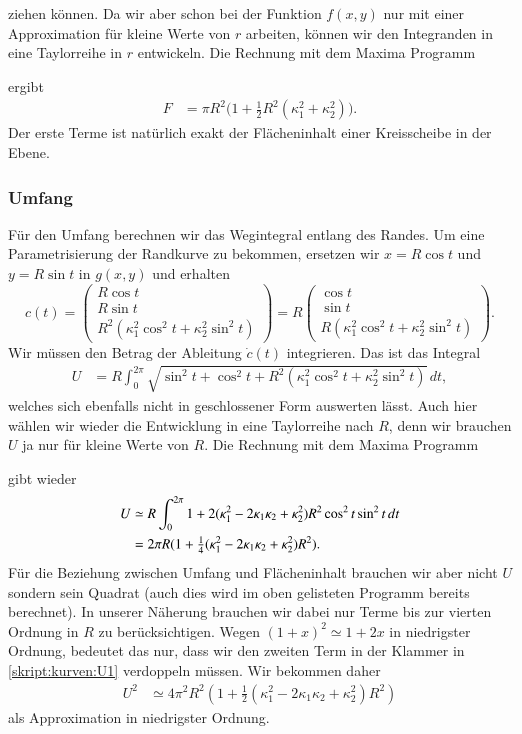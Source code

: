 ziehen können.
Da wir aber schon bei der Funktion $f(x,y)$ nur mit einer Approximation
für kleine Werte von $r$ arbeiten, können wir den Integranden in eine
Taylorreihe in $r$ entwickeln.
Die Rechnung mit dem Maxima Programm

ergibt
\begin{align*}
F
&=
\pi R^2
\bigl(
1
+
{\textstyle\frac12} R^2(\kappa_1^2+\kappa_2^2)
\bigr).
\end{align*}
Der erste Terme ist natürlich exakt der Flächeninhalt einer Kreisscheibe
in der Ebene.

\subsubsection{Umfang}
Für den Umfang berechnen wir das Wegintegral entlang des Randes.
Um eine Parametrisierung der Randkurve zu bekommen,
ersetzen wir $x=R\cos t$ und $y=R\sin t$ in $g(x,y)$ und erhalten
\[
c(t)
=
\begin{pmatrix}
R\cos t\\ R\sin t\\ R^2(\kappa_1^2\cos^2 t + \kappa_2^2\sin^2 t)
\end{pmatrix}
=
R
\begin{pmatrix}
\cos t\\ \sin t\\ R(\kappa_1^2\cos^2 t + \kappa_2^2\sin^2 t)
\end{pmatrix}.
\]
Wir müssen den Betrag der Ableitung $\dot c(t)$ integrieren.
Das ist das Integral
\begin{align*}
U
&=
R
\int_0^{2\pi}
\sqrt{
\sin^2 t + \cos^2 t 
+ R^2(\kappa_1^2 \cos^2 t + \kappa_2^2\sin^2 t)
}
\,dt,
\end{align*}
welches sich ebenfalls nicht in geschlossener Form auswerten lässt.
Auch hier wählen wir wieder die Entwicklung in eine Taylorreihe nach $R$,
denn wir brauchen $U$ ja nur für kleine Werte von $R$.
Die Rechnung mit dem Maxima Programm

gibt wieder
\begin{align}
U
&\simeq
R
\int_0^{2\pi}
1 + 2(\kappa_1^2 - 2\kappa_1\kappa_2 + \kappa_2^2)R^2 \cos^2 t\sin^2 t
\,dt
\notag
\\
&=
2\pi R
(
1
+ 
{\textstyle \frac14}(\kappa_1^2 -2\kappa_1\kappa_2+\kappa_2^2) R^2
).
\label{skript:kurven:U1}
\end{align}
Für die Beziehung zwischen Umfang und Flächeninhalt brauchen wir aber nicht
$U$ sondern sein Quadrat (auch dies wird im oben gelisteten Programm bereits
berechnet).
In unserer Näherung brauchen wir dabei nur Terme bis zur vierten Ordnung
in $R$ zu berücksichtigen.
Wegen $(1+x)^2 \simeq 1+2x$ in niedrigster Ordnung, bedeutet das nur,
dass wir den zweiten Term in der Klammer in \eqref{skript:kurven:U1}
verdoppeln müssen.
Wir bekommen daher
\begin{align*}
U^2
&\simeq
4\pi^2 R^2(
1
+
{\textstyle \frac12}
(\kappa_1^2-2\kappa_1\kappa_2 + \kappa_2^2)R^2
)
\end{align*}
als Approximation in niedrigster Ordnung.


